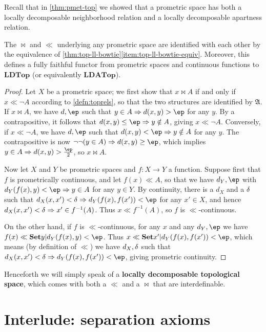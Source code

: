 \documentclass{article}
\def\cpl#1{\neg #1}
\let\implies\Rightarrow
\def\inv{^{-1}}
\def\hfep{\frac{\ep}{2}}
\def\anti{\mathfrak{A}}
\def\LDTop{\mathbf{LDTop}}
\def\LDATop{\mathbf{LDATop}}
\begin{document}
Recall that in \cref{thm:pmet-top} we showed that a prometric space has both a locally decomposable neighborhood relation and a locally decomposable apartness relation.

\begin{thm}\label{thm:promet-top}
  The $\bowtie$ and $\ll$ underlying any prometric space are identified with each other by the equivalence of \cref{thm:top-ll-bowtie}\ref{item:top-ll-bowtie-equiv}.
  Moreover, this defines a fully faithful functor from prometric spaces and continuous functions to $\LDTop$ (or equivalently $\LDATop$).
\end{thm}
\begin{proof}
  Let $X$ be a prometric space; we first show that $x\bowtie A$ if and only if $x\ll \cpl{A}$ according to \cref{defn:toprels}, so that the two structures are identified by $\anti$.
  If $x\bowtie A$, we have $d,\ep$ such that $y\in A \implies d(x,y)>\ep$ for any $y$.
  By a contrapositive, it follows that $d(x,y)\le \ep \implies y\notin A$, giving $x\ll \cpl{A}$.
  Conversely, if $x\ll\cpl{A}$, we have $d,\ep$ such that $d(x,y)< \ep \implies y\notin A$ for any $y$.
  The contrapositive is now $\neg\neg(y\in A) \implies d(x,y)\ge \ep$, which implies $y\in A \implies d(x,y)> \hfep$, so $x\bowtie A$.

  Now let $X$ and $Y$ be prometric spaces and $f:X\to Y$ a function.
  Suppose first that $f$ is prometrically continuous, and let $f(x)\ll A$, so that we have $d_Y,\ep$ with $d_Y(f(x),y)< \ep \implies y\in A$ for any $y\in Y$.
  By continuity, there is a $d_X$ and a $\delta$ such that $d_X(x,x')<\de \implies d_Y(f(x),f(x'))<\ep$ for any $x'\in X$, and hence $d_X(x,x')<\de \implies x'\in f\inv(A)$.
  Thus $x\ll f\inv(A)$, so $f$ is $\ll$-continuous.

  On the other hand, if $f$ is $\ll$-continuous, for any $x$ and any $d_Y,\ep$ we have $f(x)\ll \setof{y|d_Y(f(x),y)<\ep}$.
  Thus $x\ll \setof{x'|d_Y(f(x),f(x'))<\ep}$, which means (by definition of $\ll$) we have $d_X,\delta$ such that $d_X(x,x')<\de \implies d_Y(f(x),f(x'))<\ep$, giving prometric continuity.
\end{proof}

Henceforth we will simply speak of a \textbf{locally decomposable topological space}, which comes with both a $\ll$ and a $\bowtie$ that are interdefinable.


\section{Interlude: separation axioms}
\label{sec:separation}
\end{document}

